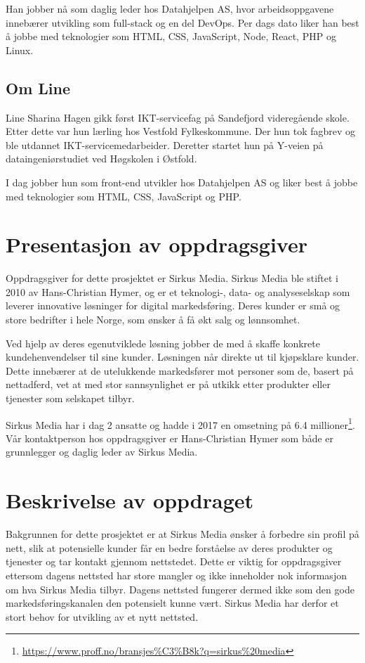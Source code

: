 Han jobber nå som daglig leder hos Datahjelpen AS, hvor arbeidsoppgavene innebærer utvikling som full-stack og en del DevOps. Per dags dato liker han best å jobbe med teknologier som HTML, CSS, JavaScript, Node, React, PHP og Linux.

\subsection{Om Line}
Line Sharina Hagen gikk først IKT-servicefag på Sandefjord videregående skole. Etter dette var hun lærling hos Vestfold Fylkeskommune. Der hun tok fagbrev og ble utdannet IKT-servicemedarbeider. Deretter startet hun på Y-veien på dataingeniørstudiet ved Høgskolen i Østfold.

I dag jobber hun som front-end utvikler hos Datahjelpen AS og liker best å jobbe med teknologier som HTML, CSS, JavaScript og PHP.

\section{Presentasjon av oppdragsgiver}
Oppdragsgiver for dette prosjektet er Sirkus Media.
Sirkus Media ble stiftet i 2010 av Hans-Christian Hymer, og er et teknologi-, data- og analyseselskap som leverer innovative løsninger for digital markedsføring. Deres kunder er små og store bedrifter i hele Norge, som ønsker å få økt salg og lønnsomhet. 

Ved hjelp av deres egenutviklede løsning jobber de med å skaffe konkrete kundehenvendelser til sine kunder. Løsningen når direkte ut til kjøpsklare kunder. Dette innebærer at de utelukkende markedsfører mot personer som de, basert på nettadferd, vet at med stor sannsynlighet er på utkikk etter produkter eller tjenester som selskapet tilbyr.

Sirkus Media har i dag 2 ansatte og hadde i 2017 en omsetning på 6.4 millioner\footnote{\url{https://www.proff.no/bransjes\%C3\%B8k?q=sirkus\%20media}}.
Vår kontaktperson hos oppdragsgiver er Hans-Christian Hymer som både er grunnlegger og daglig leder av Sirkus Media. 

\section{Beskrivelse av oppdraget}
\label{sec:oppgaven}
Bakgrunnen for dette prosjektet er at Sirkus Media ønsker å forbedre sin profil på nett, slik at potensielle kunder får en bedre forståelse av deres produkter og tjenester og tar kontakt gjennom nettstedet. Dette er viktig for oppdragsgiver ettersom dagens nettsted har store mangler og ikke inneholder nok informasjon om hva Sirkus Media tilbyr. Dagens nettsted fungerer dermed ikke som den gode markedsføringskanalen den potensielt kunne vært. Sirkus Media har derfor et stort behov for utvikling av et nytt nettsted.

